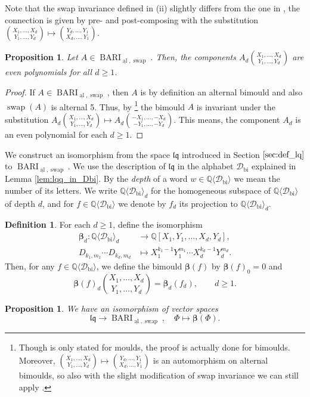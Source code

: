 \documentclass[12pt,reqno]{amsart}
\newtheorem{prop}[thm]{Proposition}
\numberwithin{equation}{section}
\theoremstyle{definition}
\newtheorem{defi}[thm]{Definition}
\newcommand{\QQ}{\mathbb{Q}}
\newcommand{\BARI}{\operatorname{BARI}_{\underline{\operatorname{al}},\operatorname{swap}}}
\newcommand{\bimap}{\boldsymbol{\beta}}
\newcommand{\Dbi}{\mathcal{D}_{\operatorname{bi}}}
\newcommand{\QDbi}{\QQ\langle \Dbi\rangle}
\newcommand{\lqq}{\mathfrak{lq}}
\begin{document}
Note that the swap invariance defined in (ii) slightly differs from the one in \cite[§2.4]{Sc15}, the connection is given by pre- and post-composing with the substitution $\binom{X_1,\ldots,X_d}{Y_1,\ldots,Y_d}\mapsto\binom{Y_d,\ldots,Y_1}{X_d,\ldots,Y_1}$.

\begin{prop} \label{prop:bari_parity} \cite{Sc15} Let $A\in \BARI$. Then, the components $A_d\binom{X_1,\ldots,X_d}{Y_1,\ldots,Y_d}$ are even polynomials for all $d\geq1$.
\end{prop}

\begin{proof}
If $A\in\BARI$, then $A$ is by definition an alternal bimould and also $\operatorname{swap}(A)$ is alternal 5. Thus, by \cite[Lemma 2.5.5]{Sc15}\footnote{Though \cite[Lemma 2.5.5]{Sc15} is only stated for moulds, the proof is actually done for bimoulds. Moreover, $\binom{X_1,\ldots,X_d}{Y_1,\ldots,Y_d}\mapsto\binom{Y_d,\ldots,Y_1}{X_d,\ldots,Y_1}$ is an automorphism on alternal bimoulds, so also with the slight modification of swap invariance we can still apply \cite[Lemma 2.5.5.]{Sc15}.} the bimould $A$ is invariant under the substitution $A_d\binom{X_1,\ldots,X_d}{Y_1,\ldots,Y_d}\mapsto A_d\binom{-X_1,\ldots,-X_d}{-Y_1,\ldots,-Y_d}$. This means, the component $A_d$ is an even polynomial for each $d\geq1$.
\end{proof}

We construct an isomorphism from the space $\lqq$ introduced in Section $\ref{sec:def_lq}$ to $\BARI$. We use the description of $\lqq$ in the alphabet $\Dbi$ explained in Lemma \ref{lem:lqq_in_Dbi}.
By the \emph{depth} of a word $w\in \QDbi$ we mean the number of its letters. We write $\QDbi_d$ for the homogeneous subspace of $\QDbi$ of depth $d$, and for $f\in \QDbi$ we denote by $f_d$ its projection to $\QDbi_d$.

\begin{defi} \label{def:bimap} For each $d\geq1$, define the isomorphism 
\begin{align*}
\bimap_d: \QDbi_d&\to \QQ[X_1,Y_1,\ldots,X_d,Y_d], \\
D_{k_1,m_1}\cdots D_{k_d,m_d}&\mapsto X_1^{k_1-1}Y_1^{m_1}\cdots X_d^{k_d-1}Y_d^{m_d}.
\end{align*}
Then, for any $f\in \QDbi$, we define the bimould $\bimap(f)$ by $\bimap(f)_0=0$ and
\[\bimap(f)_d\binom{X_1,\ldots,X_d}{Y_1,\ldots,Y_d}=\bimap_d(f_d),\qquad d\geq1.\]
\end{defi}

\begin{prop} \label{prop:bimap_vsiso} We have an isomorphism of vector spaces
\[\lqq\to \BARI,\quad \Phi\mapsto \bimap(\Phi).\]
\end{prop}
\end{document}
